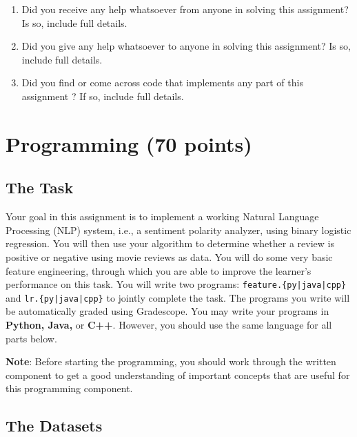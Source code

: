 \documentclass[11pt,addpoints,answers]{exam}
\begin{document}
\begin{enumerate}
    \item Did you receive any help whatsoever from anyone in solving this assignment? Is so, include full details.
    \item Did you give any help whatsoever to anyone in solving this assignment? Is so, include full details.
    \item Did you find or come across code that implements any part of this assignment ? If so, include full details.
\end{enumerate}

\begin{your_solution}[height=6cm]

\end{your_solution}

\newpage

\section{Programming (70 points)}

\subsection{The Task}\label{task}

Your goal in this assignment is to implement a working Natural Language Processing (NLP) system, i.e., a sentiment polarity analyzer, using binary logistic regression. You will then use your algorithm to determine whether a review is positive or negative using movie reviews as data. You will do some very basic feature engineering, through which you are able to improve the learner's performance on this task. You will write two programs: \texttt{feature.\{py|java|cpp\}} and \texttt{lr.\{py|java|cpp\}} to jointly complete the task. The programs you write will be automatically graded using Gradescope. You may write your programs in {\bf Python, Java,} or {\bf C++}. However, you should use the same language for all parts below.

\textbf{Note}: Before starting the programming, you should work through the written component to get a good understanding of important concepts that are useful for this programming component. 

\subsection{The Datasets}\label{dataset}
\end{document}
